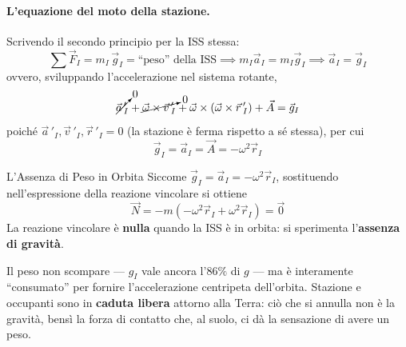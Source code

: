 \paragraph{L'equazione del moto della stazione.}
Scrivendo il secondo principio per la ISS stessa:
\begin{equation*}
    \sum\vec{F}_I = m_I\,\vec{g}_I = \text{``peso'' della ISS}
    \implies m_I\vec{a}_I = m_I\vec{g}_I \implies \vec{a}_I = \vec{g}_I
\end{equation*}
ovvero, sviluppando l'accelerazione nel sistema rotante,
\begin{equation*}
    \cancelto{0}{\vec{a}\,'_I} + \cancelto{0}{\vec{\omega}\times\vec{v}\,'_I} + \vec{\omega}\times(\vec{\omega}\times\vec{r}\,'_I) + \vec{A} = \vec{g}_I
\end{equation*}
poiché $\vec{a}\,'_I, \vec{v}\,'_I, \vec{r}\,'_I = 0$ (la stazione è ferma rispetto a sé stessa), per cui
\begin{equation}
    \vec{g}_I = \vec{a}_I = \vec{A} = -\omega^2 \vec{r}_I
\end{equation}

\begin{teorema}{L'Assenza di Peso in Orbita}
Siccome $\vec{g}_I = \vec{a}_I = -\omega^2\vec{r}_I$, sostituendo nell'espressione della reazione vincolare si ottiene
\begin{equation}
    \vec{N} = -m\left(-\omega^2\vec{r}_I + \omega^2\vec{r}_I\right) = \vec{0}
\end{equation}
La reazione vincolare è \textbf{nulla} quando la ISS è in orbita: si sperimenta l'\textbf{assenza di gravità}.

Il peso non scompare --- $g_I$ vale ancora l'$86\%$ di $g$ --- ma è interamente ``consumato'' per fornire l'accelerazione centripeta dell'orbita. Stazione e occupanti sono in \textbf{caduta libera} attorno alla Terra: ciò che si annulla non è la gravità, bensì la forza di contatto che, al suolo, ci dà la sensazione di avere un peso.
\end{teorema}
